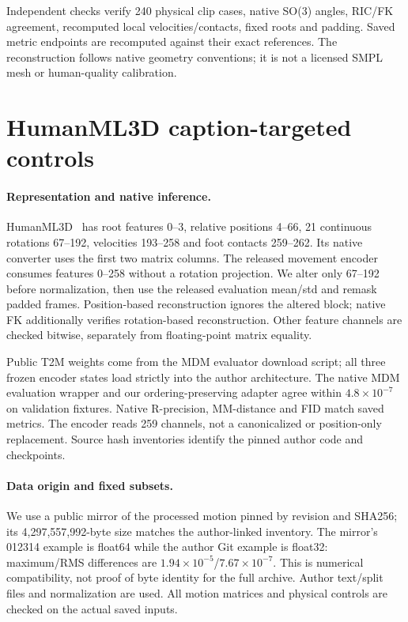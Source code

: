 \documentclass[10pt,twocolumn,letterpaper]{article}
\begin{document}
Independent checks verify 240 physical clip cases, native SO(3) angles, RIC/FK agreement, recomputed local velocities/contacts, fixed roots and padding. Saved metric endpoints are recomputed against their exact references. The reconstruction follows native geometry conventions; it is not a licensed SMPL mesh or human-quality calibration.


\section{HumanML3D caption-targeted controls}
\paragraph{Representation and native inference.}
HumanML3D~\cite{guo2022} has root features 0--3, relative positions 4--66, 21 continuous rotations 67--192, velocities 193--258 and foot contacts 259--262. Its native converter uses the first two matrix columns. The released movement encoder consumes features 0--258 without a rotation projection. We alter only 67--192 before normalization, then use the released evaluation mean/std and remask padded frames. Position-based reconstruction ignores the altered block; native FK additionally verifies rotation-based reconstruction. Other feature channels are checked bitwise, separately from floating-point matrix equality.

Public T2M weights come from the MDM evaluator download script; all three frozen encoder states load strictly into the author architecture. The native MDM evaluation wrapper and our ordering-preserving adapter agree within $4.8\times 10^{-7}$ on validation fixtures. Native R-precision, MM-distance and FID match saved metrics. The encoder reads 259 channels, not a canonicalized or position-only replacement. Source hash inventories identify the pinned author code and checkpoints.

\paragraph{Data origin and fixed subsets.}
We use a public mirror of the processed motion pinned by revision and SHA256; its 4,297,557,992-byte size matches the author-linked inventory. The mirror's 012314 example is float64 while the author Git example is float32: maximum/RMS differences are $1.94\times 10^{-5}$/$7.67\times 10^{-7}$. This is numerical compatibility, not proof of byte identity for the full archive. Author text/split files and normalization are used. All motion matrices and physical controls are checked on the actual saved inputs.
\end{document}
